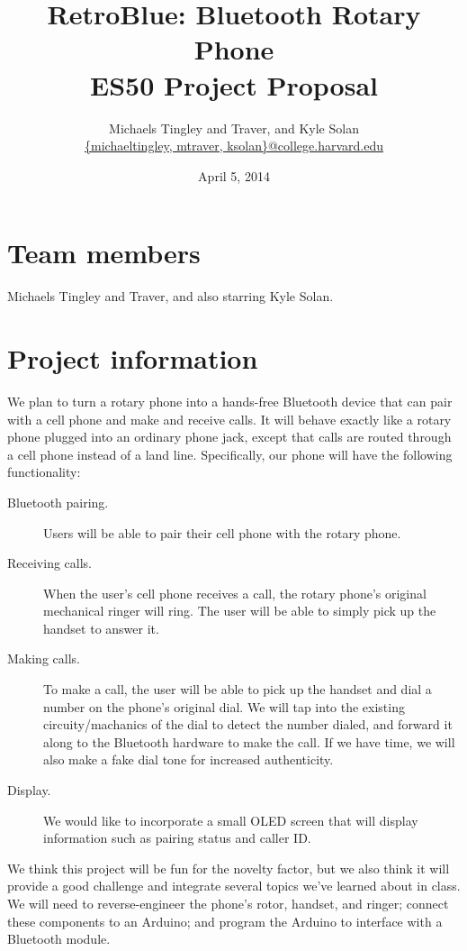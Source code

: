 \documentclass[11pt]{article}
\title{RetroBlue: Bluetooth Rotary Phone\\ES50 Project Proposal}
\author{Michaels Tingley and Traver, and Kyle Solan\\\url{{michaeltingley, mtraver, ksolan}@college.harvard.edu}}
\date{April 5, 2014}
\begin{document}
    \maketitle

    \section{Team members}
        Michaels Tingley and Traver, and also starring Kyle Solan.

    \section{Project information}
        We plan to turn a rotary phone into a hands-free Bluetooth device that can pair with a cell phone and make and receive calls. It will behave exactly like a rotary phone plugged into an ordinary phone jack, except that calls are routed through a cell phone instead of a land line. Specifically, our phone will have the following functionality:

        \begin{description}
            \item[Bluetooth pairing.] Users will be able to pair their cell phone with the rotary phone.
            \item[Receiving calls.] When the user's cell phone receives a call, the rotary phone's original mechanical ringer will ring. The user will be able to simply pick up the handset to answer it.
            \item[Making calls.] To make a call, the user will be able to pick up the handset and dial a number on the phone's original dial. We will tap into the existing circuity/machanics of the dial to detect the number dialed, and forward it along to the Bluetooth hardware to make the call. If we have time, we will also make a fake dial tone for increased authenticity.
            \item[Display.] We would like to incorporate a small OLED screen that will display information such as pairing status and caller ID.
        \end{description}

        We think this project will be fun for the novelty factor, but we also think it will provide a good challenge and integrate several topics we've learned about in class. We will need to reverse-engineer the phone's rotor, handset, and ringer; connect these components to an Arduino; and program the Arduino to interface with a Bluetooth module.
\end{document}
